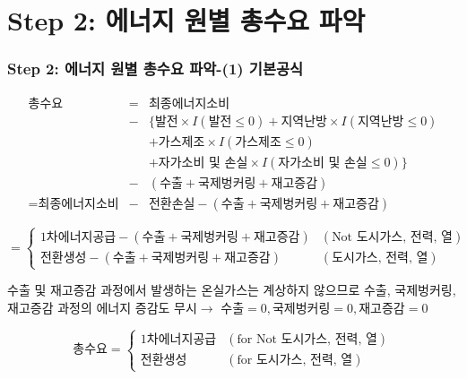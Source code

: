 \documentclass[10pt,compress,slidetop,%
			   hyperref={unicode},xcolor={svgnames},%
			   t]{beamer}
\begin{document}
\section{Step 2: 에너지 원별 총수요 파악}
%
\begin{frame}
	\frametitle{Step 2: 에너지 원별 총수요 파악-(1) 기본공식}
\begin{eqnarray*}
\mbox{총수요}&=&\mbox{최종에너지소비}\\
	&-&\{\mbox{발전}\times I(\mbox{발전}\le 0)+\mbox{지역난방}\times I(\mbox{지역난방}\le 0)\\
	& &+\mbox{가스제조}\times I(\mbox{가스제조}\le 0)\\
	& & +\mbox{자가소비 및 손실}\times I(\mbox{자가소비 및 손실}\le 0)\}\\
	&-&(\mbox{수출}+\mbox{국제벙커링}+\mbox{재고증감})\\
=\mbox{최종에너지소비}&-&\mbox{전환손실}-(\mbox{수출}+\mbox{국제벙커링}+\mbox{재고증감})
\end{eqnarray*}
\begin{small}
\begin{displaymath}
=\left\{\begin{array}{lr}
\mbox{1차에너지공급}-(\mbox{수출}+\mbox{국제벙커링}+\mbox{재고증감})&(\mbox{Not 도시가스, 전력, 열})\\
\mbox{전환생성}-(\mbox{수출}+\mbox{국제벙커링}+\mbox{재고증감})&(\mbox{도시가스, 전력, 열})
\end{array}\right.
\end{displaymath}
\end{small}
\smallskip
\begin{small}
수출 및 재고증감 과정에서 발생하는 온실가스는 계상하지 않으므로 수출, 국제벙커링, 재고증감 과정의 에너지 증감도 무시$\rightarrow$ $\mbox{수출}=0, \mbox{국제벙커링} =0,\mbox{재고증감}=0$ 
\end{small}
\begin{displaymath}
\mbox{총수요}=\left\{\begin{array}{ll}
\mbox{1차에너지공급}&(\mbox{for Not 도시가스, 전력, 열})\\
\mbox{전환생성}&(\mbox{for 도시가스, 전력, 열})
\end{array}\right.
\end{displaymath}


\end{frame}
\end{document}
